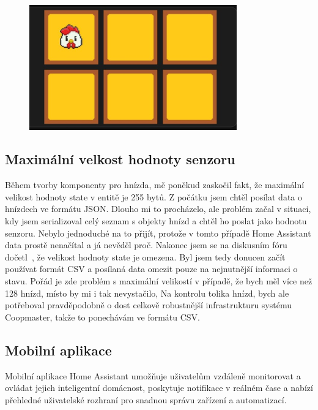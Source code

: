 \begin{figure}[H]
    \centering
    \includegraphics[width=0.8\textwidth]{img/homeassitant_custom_component}
    \label{fig:homeassitant_custom_component}
\end{figure}



\subsection*{Maximální velkost hodnoty senzoru}
Během tvorby komponenty pro hnízda, mě poněkud zaskočil fakt, že maximální velikost hodnoty state v entitě je 255 bytů.
Z počátku jsem chtěl posílat data o hnízdech ve formátu JSON.
Dlouho mi to procházelo, ale problém začal v situaci, kdy jsem serializoval celý seznam s objekty hnízd a chtěl ho poslat jako hodnotu senzoru.
Nebylo jednoduché na to přijít, protože v tomto případě Home Assistant data prostě nenačítal a já nevěděl proč.
Nakonec jsem se na diskusním fóru dočetl~\cite{HAStateLimit255}, že velikost hodnoty state je omezena.
Byl jsem tedy donucen začít používat formát CSV a posílaná data omezit pouze na nejnutnější informaci o stavu.
Pořád je zde problém s maximální velikostí v případě, že bych měl více než 128 hnízd, místo by mi i tak nevystačilo,
Na kontrolu tolika hnízd, bych ale potřeboval pravděpodobně o dost celkově robustnější infrastrukturu systému Coopmaster, takže to ponechávám ve formátu CSV.

\subsection*{Mobilní aplikace}
Mobilní aplikace Home Assistant umožňuje uživatelům vzdáleně monitorovat a ovládat jejich inteligentní domácnost, poskytuje notifikace v reálném čase a nabízí přehledné uživatelské rozhraní pro snadnou správu zařízení a automatizací.

